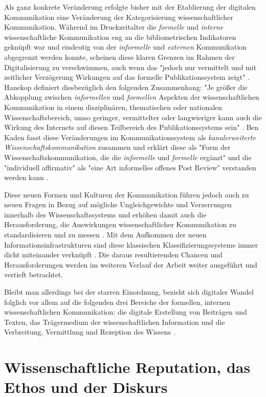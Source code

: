 Als ganz konkrete Veränderung erfolgte bisher mit der Etablierung der digitalen Kommunikation eine Veränderung der Kategorisierung wissenschaftlicher Kommunikation. Während im Druckzeitalter die \textit{formelle} und \textit{interne} wissenschaftliche Kommunikation eng an die bibliometrischen Indikatoren geknüpft war und eindeutig von der \textit{informelle} und \textit{externen} Kommunikation abgegrenzt werden konnte, scheinen diese klaren Grenzen im Rahmen der Digitalisierung zu verschwimmen, auch wenn das "jedoch nur vermittelt und mit zeitlicher Verzögerung Wirkungen auf das formelle Publikationssystem zeigt" \cite{Hanekop_2014}. Hanekop definiert diesbezüglich den folgenden Zusammenhang: "Je größer die Abkopplung zwischen \textit{informellen} und \textit{formellen} Aspekten der wissenschaftlichen Kommunikation in einem disziplinären, thematischen oder nationalen Wissenschaftsbereich, umso geringer, vermittelter oder langwieriger kann auch die Wirkung des Internets auf diesen Teilbereich des Publikationssystems sein" \cite{Hanekop_2014}. Ben Kaden fasst diese Veränderungen im Kommunikationssystem als \textit{kanalerweiterte Wissenschaftskommunikation} zusammen und erklärt diese als "Form der Wissenschaftskommunikation, die die \textit{informelle} und \textit{formelle} ergänzt" und die "individuell affirmativ" als "eine Art informelles offenes Post Review" verstanden werden kann \cite{Kaden_2009}.

Diese neuen Formen und Kulturen der Kommunikation führen jedoch auch zu neuen Fragen in Bezug auf mögliche Ungleichgewichte und Verzerrungen innerhalb des Wissenschaftssystems und erhöhen damit auch die Herausforderung, die Auswirkungen wissenschaftlicher Kommunikation zu standardisieren und zu messen \cite{Gerber_2014}. Mit dem Aufkommen der neuen Informationsinfrastrukturen sind diese klassischen Klassifizierungssysteme immer dicht miteinander verknüpft \cite[:326]{Bowker_2000}. Die daraus resultierenden Chancen und Herausforderungen werden im weiteren Verlauf der Arbeit weiter ausgeführt und vertieft betrachtet.

Bleibt man allerdings bei der starren Einordnung, bezieht sich digitaler Wandel folglich vor allem auf die folgenden drei Bereiche der formellen, internen wissenschaftlichen Kommunikation: die digitale Erstellung von Beiträgen und Texten, das Trägermedium der wissenschaftlichen Information und die Verbreitung, Vermittlung und Rezeption des Wissens \cite[:19]{BBAW_2015}.

\section{Wissenschaftliche Reputation, das Ethos und der Diskurs}

